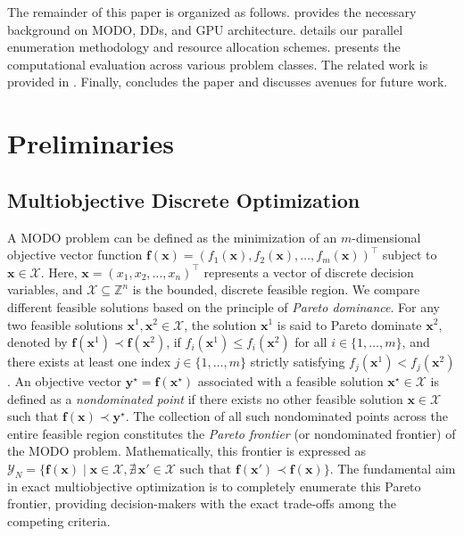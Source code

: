 \documentclass[letterpaper]{article}
\begin{document}
The remainder of this paper is organized as follows.  provides the necessary background on MODO, DDs, and GPU architecture.  details our parallel enumeration methodology and resource allocation schemes.  presents the computational evaluation across various problem classes. The related work is provided in . Finally,  concludes the paper and discusses avenues for future work.

\section{Preliminaries}
\label{sec:prelim}
\subsection{Multiobjective Discrete Optimization}
\label{sec:prelim_modo}
A MODO problem can be defined as the minimization of an $m$-dimensional objective vector function $\mathbf{f}(\mathbf{x}) = (f_1(\mathbf{x}), f_2(\mathbf{x}), \dots, f_m(\mathbf{x}))^\top$ subject to $\mathbf{x} \in \mathcal{X}$. Here, $\mathbf{x} = (x_1, x_2, \dots, x_n)^\top$ represents a vector of discrete decision variables, and $\mathcal{X} \subseteq \mathbb{Z}^n$ is the bounded, discrete feasible region. We compare different feasible solutions based on the principle of \emph{Pareto dominance}. For any two feasible solutions $\mathbf{x}^1, \mathbf{x}^2 \in \mathcal{X}$, the solution $\mathbf{x}^1$ is said to Pareto dominate $\mathbf{x}^2$, denoted by $\mathbf{f}(\mathbf{x}^1) \prec \mathbf{f}(\mathbf{x}^2)$, if $f_i(\mathbf{x}^1) \le f_i(\mathbf{x}^2)$ for all $i \in \{1, \dots, m\}$, and there exists at least one index $j \in \{1, \dots, m\}$ strictly satisfying $f_j(\mathbf{x}^1) < f_j(\mathbf{x}^2)$.
An objective vector $\mathbf{y}^\star = \mathbf{f}(\mathbf{x}^\star)$ associated with a feasible solution $\mathbf{x}^\star \in \mathcal{X}$ is defined as a \emph{nondominated point} if there exists no other feasible solution $\mathbf{x} \in \mathcal{X}$ such that $\mathbf{f}(\mathbf{x}) \prec \mathbf{y}^\star$. The collection of all such nondominated points across the entire feasible region constitutes the \emph
{Pareto frontier} (or nondominated frontier) of the MODO problem. Mathematically, this frontier is expressed as $\mathcal{Y}_N = \{\mathbf{f}(\mathbf{x}) \mid \mathbf{x} \in \mathcal{X}, \nexists \, \mathbf{x}' \in \mathcal{X} \text{ such that } \mathbf{f}(\mathbf{x}') \prec \mathbf{f}(\mathbf{x})\}$. The fundamental aim in exact multiobjective optimization is to completely enumerate this Pareto frontier, providing decision-makers with the exact trade-offs among the competing criteria.
\end{document}
